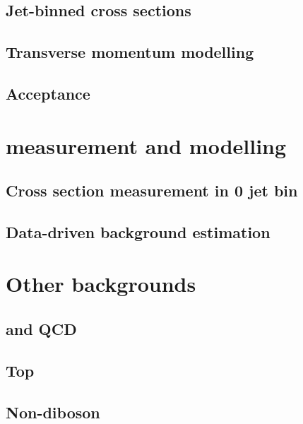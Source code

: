 \documentclass[hyper,linkcolor=blue]{mythesis}
\begin{document}
\begin{mainmatter}
    \section{Jet-binned cross sections}
      \label{sec:ggf_jetbin}
      
    \section{Transverse momentum modelling}
      \label{sec:ggf_pt}
      
    \section{Acceptance}
      \label{sec:ggf_acc}
      

  \chapter{\WW measurement and modelling}
    \label{chap:ww}
    
    \section{Cross section measurement in 0 jet bin}
      \label{sec:ww_meas}
      
    \section{Data-driven background estimation}
      \label{sec:ww_bkg}
      

  \chapter{Other backgrounds}
    \label{chap:backgrounds}
    
    \section{\Wjets and QCD}
      \label{sec:wjets}
      
    \section{Top}
      \label{sec:top}
      
    \section{\Zjets}
      \label{sec:dy}
      
    \section{Non-\WW diboson}
      \label{sec:diboson}
      


\end{mainmatter}
\end{document}

